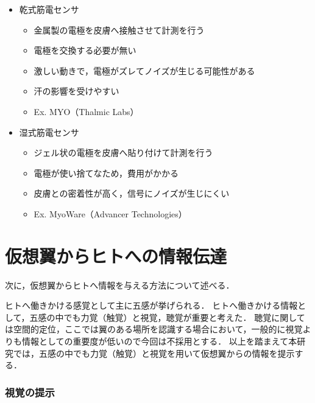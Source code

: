    \begin{itemize}
    \item 乾式筋電センサ
        \begin{itemize}
        \item 金属製の電極を皮膚へ接触させて計測を行う
        \item 電極を交換する必要が無い
        \item 激しい動きで，電極がズレてノイズが生じる可能性がある
        \item 汗の影響を受けやすい
        \item Ex. MYO（Thalmic Labs）
        \end{itemize}

    \item 湿式筋電センサ
        \begin{itemize}
        \item ジェル状の電極を皮膚へ貼り付けて計測を行う
        \item 電極が使い捨てなため，費用がかかる
        \item 皮膚との密着性が高く，信号にノイズが生じにくい
        \item Ex. MyoWare（Advancer Technologies）
        \end{itemize}
    \end{itemize}

    
\section{仮想翼からヒトへの情報伝達}


    次に，仮想翼からヒトへ情報を与える方法について述べる．

    ヒトへ働きかける感覚として主に五感が挙げられる．
    ヒトへ働きかける情報として，五感の中でも力覚（触覚）と視覚，聴覚が重要と考えた．
    聴覚に関しては空間的定位，ここでは翼のある場所を認識する場合において，一般的に視覚よりも情報としての重要度が低い\cite{岡嶋克典20182}ので今回は不採用とする．
    以上を踏まえて本研究では，五感の中でも力覚（触覚）と視覚を用いて仮想翼からの情報を提示する．

    \subsubsection{視覚の提示}
 
